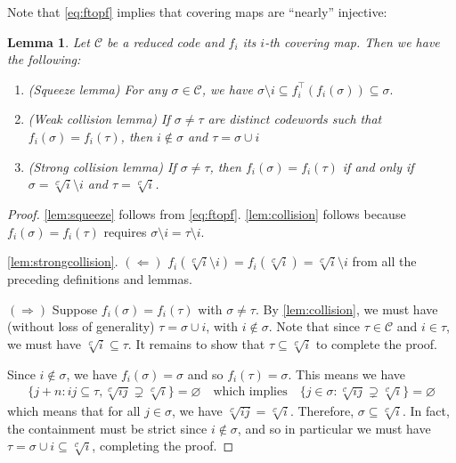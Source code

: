 \documentclass[11pt,letterpaper, reqno]{amsart}
\newtheorem{lem}[thm]{Lemma}         %
\theoremstyle{definition}
\def\cC{\mathcal{C}}
\begin{document}
        Note that \cref{eq:ftopf} implies that covering maps are ``nearly'' injective:
        \begin{lem}\label{lem:squeezeandcollision}
            Let $\cC$ be a reduced code and $f_i$ its $i$-th covering map. Then we have the following:
            \begin{enumerate}
                \item\label{lem:squeeze} (Squeeze lemma) For any $\sigma \in \cC$, we have $\sigma \setminus i \subseteq f_i^\top(f_i(\sigma)) \subseteq \sigma.$
                \item\label{lem:collision} (Weak collision lemma) If $\sigma \neq \tau$ are distinct codewords such that $f_i(\sigma) = f_i(\tau)$, then $i \notin \sigma$ and $\tau = \sigma\cup i$
                \item\label{lem:strongcollision} (Strong collision lemma) If $\sigma\neq \tau$, then $f_i(\sigma) = f_i(\tau)$ if and only if $\sigma = \sqrt[\cC]{i} \setminus i$ and $\tau = \sqrt[\cC]{i}$.
            \end{enumerate}
        \end{lem}
        \begin{proof}
            \cref{lem:squeeze} follows from \cref{eq:ftopf}.
            \cref{lem:collision} follows because $f_i(\sigma) = f_i(\tau)$ requires $\sigma\setminus i = \tau \setminus i$.
    
        
            \cref{lem:strongcollision}.
            $(\Leftarrow)$ $f_i(\sqrt[\cC]{i}\setminus i) = f_i(\sqrt[\cC]{i}) = \sqrt[\cC]{i}\setminus i$ from all the preceding definitions and lemmas.
            
            $(\Rightarrow)$ Suppose $f_i(\sigma) = f_i(\tau)$ with $\sigma\neq \tau$.
            By \cref{lem:collision}, we must have (without loss of generality) $\tau = \sigma\cup i$, with $i\notin \sigma$. Note that since $\tau \in \cC$ and $i \in \tau$, we must have $\sqrt[\cC]{i} \subseteq \tau$.
            It remains to show that $\tau \subseteq \sqrt[\cC]{i}$ to complete the proof.
            
            Since $i \notin \sigma$, we have $f_i(\sigma) = \sigma$ and so $f_i(\tau) = \sigma$.
            This means we have
                \begin{align*}
                    \{j + n : ij\subseteq \tau, \sqrt[\cC]{ij} \supsetneq \sqrt[\cC]{i}\} = \varnothing
                    \quad \text{which implies}\quad \{ j \in \sigma : \sqrt[\cC]{ij} \supsetneq \sqrt[\cC]{i}\} = \varnothing
                \end{align*}
                which means that for all $j \in \sigma$, we have $\sqrt[\cC]{ij} = \sqrt[\cC]{i}$. Therefore, $\sigma \subseteq \sqrt[\cC]{i}$.
                In fact, the containment must be strict since $i \notin \sigma$, and so in particular we must have $\tau = \sigma \cup i \subseteq \sqrt[\cC]{i}$, completing the proof.
        \end{proof}
\end{document}
